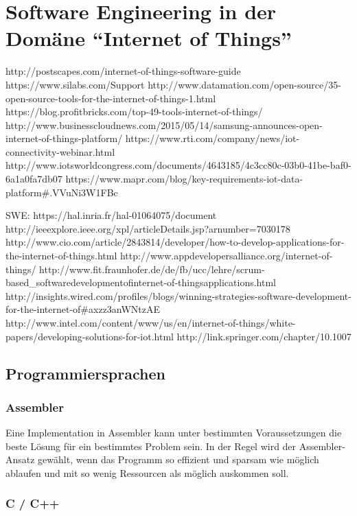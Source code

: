 \chapter{Software Engineering in der Domäne "`Internet of Things"'}


http://postscapes.com/internet-of-things-software-guide
https://www.silabs.com/Support%
http://www.datamation.com/open-source/35-open-source-tools-for-the-internet-of-things-1.html
https://blog.profitbricks.com/top-49-tools-internet-of-things/
http://www.businesscloudnews.com/2015/05/14/samsung-announces-open-internet-of-things-platform/
https://www.rti.com/company/news/iot-connectivity-webinar.html
http://www.iotsworldcongress.com/documents/4643185/4c3cc80c-03b0-41be-baf0-6a1a0fa7db07
https://www.mapr.com/blog/key-requirements-iot-data-platform#.VVuNi3W1FBc


SWE:
https://hal.inria.fr/hal-01064075/document
http://ieeexplore.ieee.org/xpl/articleDetails.jsp?arnumber=7030178
http://www.cio.com/article/2843814/developer/how-to-develop-applications-for-the-internet-of-things.html
http://www.appdevelopersalliance.org/internet-of-things/
http://www.fit.fraunhofer.de/de/fb/ucc/lehre/scrum-based_softwaredevelopmentofinternet-of-thingsapplications.html
http://insights.wired.com/profiles/blogs/winning-strategies-software-development-for-the-internet-of#axzz3anWNtzAE
http://www.intel.com/content/www/us/en/internet-of-things/white-papers/developing-solutions-for-iot.html
http://link.springer.com/chapter/10.1007%

\section{Programmiersprachen}

\subsection{Assembler}
Eine Implementation in Assembler kann unter bestimmten Voraussetzungen die beste Lösung für ein bestimmtes Problem sein. In der Regel wird der Assembler-Ansatz gewählt, wenn das Programm so effizient und sparsam wie möglich ablaufen und mit so wenig Ressourcen als möglich auskommen soll.



\subsection{C / C++}


